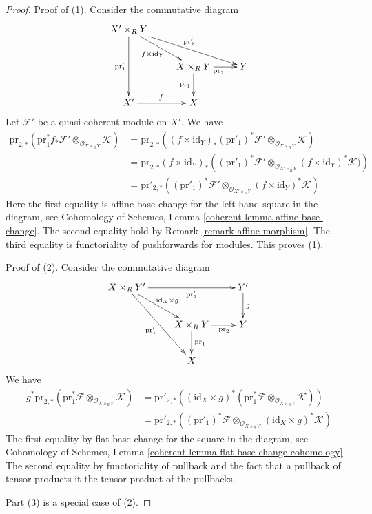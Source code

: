\documentclass[10pt,a4paper]{amsart}
\theoremstyle{plain}
\theoremstyle{definition}
\theoremstyle{remark}
\numberwithin{equation}{subsection}
\begin{document}
\begin{proof}
Proof of (1). Consider the commutative diagram
$$
\xymatrix{
X' \times_R Y \ar[rrd]^{\text{pr}'_2} \ar[rd]_{f \times \text{id}_Y}
\ar[dd]_{\text{pr}'_1} \\
& X \times_R Y \ar[r]_{\text{pr}_2} \ar[d]_{\text{pr}_1} & Y \\
X' \ar[r]^f & X
}
$$
Let $\mathcal{F}'$ be a quasi-coherent module on $X'$. We have
\begin{align*}
\text{pr}_{2, *}(\text{pr}_1^*f_*\mathcal{F}'
\otimes_{\mathcal{O}_{X \times_R Y}} \mathcal{K})
& =
\text{pr}_{2, *}((f \times \text{id}_Y)_*
(\text{pr}'_1)^*\mathcal{F}'
\otimes_{\mathcal{O}_{X \times_R Y}} \mathcal{K}) \\
& =
\text{pr}_{2, *}(f \times \text{id}_Y)_*
\left((\text{pr}'_1)^*\mathcal{F}'
\otimes_{\mathcal{O}_{X' \times_R Y}}
(f \times \text{id}_Y)^*\mathcal{K})\right)  \\
& =
\text{pr}'_{2, *}((\text{pr}'_1)^*\mathcal{F}'
\otimes_{\mathcal{O}_{X' \times_R Y}} (f \times \text{id}_Y)^*\mathcal{K})
\end{align*}
Here the first equality is affine base change for the left hand
square in the diagram, see
Cohomology of Schemes, Lemma \ref{coherent-lemma-affine-base-change}.
The second equality hold by Remark \ref{remark-affine-morphism}.
The third equality is functoriality of pushforwards for modules.
This proves (1).

\medskip\noindent
Proof of (2). Consider the commutative diagram
$$
\xymatrix{
X \times_R Y' \ar[rr]_-{\text{pr}'_2} \ar[rd]^{\text{id}_X \times g}
\ar[rdd]_{\text{pr}'_1} & & Y' \ar[d]^g \\
& X \times_R Y \ar[r]_-{\text{pr}_2} \ar[d]^{\text{pr}_1} & Y \\
& X
}
$$
We have
\begin{align*}
g^*\text{pr}_{2, *}(\text{pr}_1^*\mathcal{F}
\otimes_{\mathcal{O}_{X \times_R Y}} \mathcal{K})
& =
\text{pr}'_{2, *}(
(\text{id}_X \times g)^*(
\text{pr}_1^*\mathcal{F} \otimes_{\mathcal{O}_{X \times_R Y}} \mathcal{K})) \\
& =
\text{pr}'_{2, *}((\text{pr}'_1)^*\mathcal{F}
\otimes_{\mathcal{O}_{X \times_R Y'}}
(\text{id}_X \times g)^*\mathcal{K})
\end{align*}
The first equality by flat base change for the square in the diagram, see
Cohomology of Schemes, Lemma \ref{coherent-lemma-flat-base-change-cohomology}.
The second equality by functoriality of pullback and the fact that
a pullback of tensor products it the tensor product of the pullbacks.

\medskip\noindent
Part (3) is a special case of (2).
\end{proof}
\end{document}
